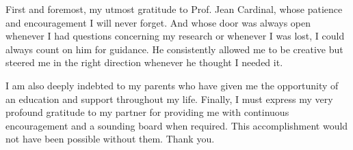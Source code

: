\documentclass[
    english, %
    onehalfspacing, %
    headsepline, %
    parskip, %
]{MastersDoctoralThesis} %
\theoremstyle{definition}
\theoremstyle{remark}
\theoremstyle{plain}
\numberwithin{theorem}{section}
\begin{document}
    \begin{acknowledgements}
        \addchaptertocentry{\acknowledgementname} %
        First and foremost, my utmost gratitude to Prof. Jean Cardinal, whose patience and encouragement I will never forget.
        And whose door was always open whenever I had questions concerning my research or whenever I was lost, I could always
        count on him for guidance. He consistently allowed me to be creative but steered me in the right direction whenever
        he thought I needed it.

        I am also deeply indebted to my parents who have given me the opportunity of an education and support throughout my life.
        Finally, I must express my very profound gratitude to my partner for providing me with continuous encouragement
        and a sounding board when required. This accomplishment would not have been possible without them. Thank you.

    \end{acknowledgements}

    \hypersetup{linkcolor=black}
    \tableofcontents %




\end{document}
